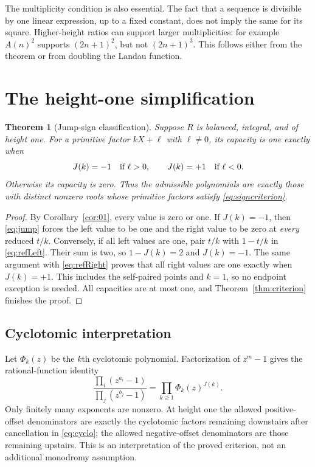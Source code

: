 \documentclass[11pt]{article}
\newtheorem{theorem}{Theorem}[section]
\theoremstyle{definition}
\theoremstyle{remark}
\begin{document}
The multiplicity condition is also essential. The fact that a sequence
is divisible by one linear expression, up to a fixed constant, does
not imply the same for its square. Higher-height ratios can support
larger multiplicities: for example $A(n)^2$ supports $(2n+1)^2$, but
not $(2n+1)^3$. This follows either from the theorem or from doubling
the Landau function.

\section{The height-one simplification}
\begin{theorem}[Jump-sign classification]\label{thm:heightone}
Suppose $R$ is balanced, integral, and of height one. For a primitive
factor $kX+\ell$ with $\ell\ne0$, its capacity is one exactly when
\begin{equation}\label{eq:signcriterion}
 J(k)=-1\quad\hbox{if }\ell>0,
 \qquad
 J(k)=+1\quad\hbox{if }\ell<0.
\end{equation}
Otherwise its capacity is zero. Thus the admissible polynomials are
exactly those with distinct nonzero roots whose primitive factors
satisfy \eqref{eq:signcriterion}.
\end{theorem}
\begin{proof}
By Corollary~\ref{cor:01}, every value is zero or one. If $J(k)=-1$,
then \eqref{eq:jump} forces the left value to be one and the right value
to be zero at \emph{every} reduced $t/k$. Conversely, if all left
values are one, pair $t/k$ with $1-t/k$ in \eqref{eq:refLeft}. Their
sum is two, so $1-J(k)=2$ and $J(k)=-1$.
The same argument with \eqref{eq:refRight} proves that all right
values are one exactly when $J(k)=+1$. This includes the self-paired
points and $k=1$, so no endpoint exception is needed. All capacities
are at most one, and Theorem~\ref{thm:criterion} finishes the proof.
\end{proof}

\subsection{Cyclotomic interpretation}
Let $\Phi_k(z)$ be the $k$th cyclotomic polynomial. Factorization of
$z^m-1$ gives the rational-function identity
\begin{equation}\label{eq:cyclo}
 \frac{\prod_i(z^{a_i}-1)}{\prod_j(z^{b_j}-1)}
 =\prod_{k\geq1}\Phi_k(z)^{J(k)}.
\end{equation}
Only finitely many exponents are nonzero. At height one the allowed
positive-offset denominators are exactly the cyclotomic factors
remaining downstairs after cancellation in \eqref{eq:cyclo}; the
allowed negative-offset denominators are those remaining upstairs.
This is an interpretation of the proved criterion, not an additional
monodromy assumption.
\end{document}
